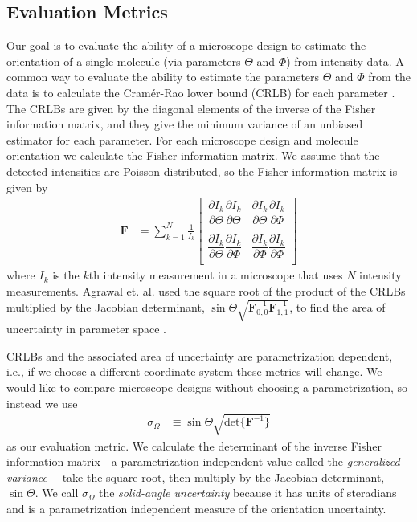 \documentclass[10pt]{article}
\providecommand{\mb}[1]{\mathbf{#1}}
\begin{document}
\subsection{Evaluation Metrics}\label{metrics}
Our goal is to evaluate the ability of a microscope design to estimate the
orientation of a single molecule (via parameters $\Theta$ and $\Phi$) from
intensity data. A common way to evaluate the ability to estimate the parameters
$\Theta$ and $\Phi$ from the data is to calculate the Cram\'er-Rao lower bound
(CRLB) for each parameter \cite{kay1993}. The CRLBs are given by the diagonal
elements of the inverse of the Fisher information matrix, and they give the
minimum variance of an unbiased estimator for each parameter. For each
microscope design and molecule orientation we calculate the Fisher information
matrix. We assume that the detected intensities are Poisson distributed, so the
Fisher information matrix is given by
\begin{align}
  \mb{F} &= \sum_{k=1}^N \frac{1}{I_k}
  \begin{bmatrix}
    \dfrac{\partial I_k}{\partial \Theta}\dfrac{\partial I_k}{\partial \Theta}&\dfrac{\partial I_k}{\partial \Theta}\dfrac{\partial I_k}{\partial \Phi}\\\\
    \dfrac{\partial I_k}{\partial \Theta}\dfrac{\partial I_k}{\partial \Phi}&\dfrac{\partial I_k}{\partial \Phi}\dfrac{\partial I_k}{\partial \Phi}\\    
  \end{bmatrix}
\end{align}
where $I_k$ is the $k$th intensity measurement in a microscope that uses $N$
intensity measurements. Agrawal et. al. used the square root of the product of
the CRLBs multiplied by the Jacobian determinant,
$\sin\Theta\sqrt{\mb{F}^{-1}_{0,0}\mb{F}^{-1}_{1,1}}$, to find the area of
uncertainty in parameter space \cite{agrawal2012}.

CRLBs and the associated area of uncertainty are parametrization dependent,
i.e., if we choose a different coordinate system these metrics will change. We
would like to compare microscope designs without choosing a parametrization, so
instead we use
\begin{align}
  \sigma_{\Omega} &\equiv \sin\Theta\sqrt{\text{det}\{\mb{F}^{-1}\}}
\end{align}
as our evaluation metric. We calculate the determinant of the inverse Fisher
information matrix---a parametrization-independent value called the
\emph{generalized variance} \cite{anderson1958}---take the square root, then
multiply by the Jacobian determinant, $\sin\Theta$. We call $\sigma_{\Omega}$
the \emph{solid-angle uncertainty} because it has units of steradians and is a
parametrization independent measure of the orientation uncertainty.
\end{document}
